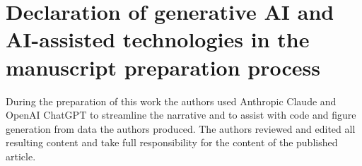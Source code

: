 \documentclass[11pt,a4paper]{article}
\newif\ifjne
\begin{document}
\ifjne
\section*{Competing interests}
Giulio Ruffini, Ricardo Salvador, Borja Mercadal, and Francesca Castaldo are employees of
Neuroelectrics, which develops and sells transcranial electrical stimulation devices.
Giulio Ruffini is a co-founder and shareholder of Neuroelectrics. The other authors
declare no competing interests.

\section*{Author contributions}
Using the CRediT taxonomy: \textbf{G.~Ruffini}: conceptualization, methodology, formal
analysis, software, investigation, visualization, writing (original draft), supervision,
funding acquisition. \textbf{R.~Salvador}: conceptualization (current-ratio steering),
methodology (head modeling), software, formal analysis, data curation, visualization.
\textbf{B.~Mercadal}: validation, visualization, writing (review and editing).
\textbf{R.~de Palma Aristides}: software, visualization, writing (review and editing).
\textbf{F.~Castaldo}: conceptualization, writing (review and editing).
\textbf{N.~Grossman}: conceptualization.
\textbf{S.~Canals}: supervision, writing (review and editing).
\textbf{C.~Mirasso}: supervision, writing (review and editing).
\fi

\section*{Declaration of generative AI and AI-assisted technologies in the manuscript
preparation process}
During the preparation of this work the authors used Anthropic Claude and OpenAI ChatGPT to
streamline the narrative and to assist with code and figure generation from data the authors
produced. The authors reviewed and edited all resulting content and take full responsibility
for the content of the published article.
\end{document}
